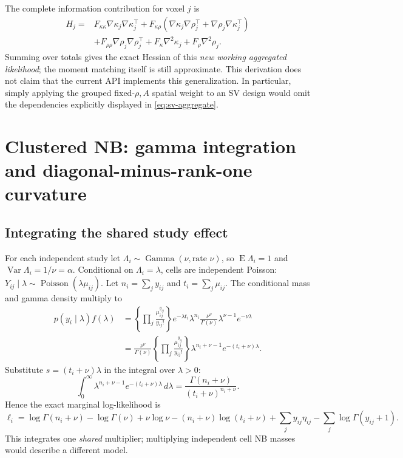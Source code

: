 \documentclass[11pt,a4paper]{article}
\newcommand{\E}{\operatorname{E}}
\newcommand{\Var}{\operatorname{Var}}
\numberwithin{equation}{section}
\begin{document}
The complete information contribution for voxel $j$ is
\begin{align}
 H_j={}&F_{\kappa\kappa}\nabla\kappa_j\nabla\kappa_j^\top
 +F_{\kappa\rho}
       (\nabla\kappa_j\nabla\rho_j^\top+\nabla\rho_j\nabla\kappa_j^\top)\\
 &+F_{\rho\rho}\nabla\rho_j\nabla\rho_j^\top
       +F_\kappa\nabla^2\kappa_j+F_\rho\nabla^2\rho_j.
 \label{eq:sv-aggregate}
\end{align}
Summing over totals gives the exact Hessian of this
\emph{new working aggregated likelihood}; the moment matching itself
is still approximate. This derivation does not claim that the current
API implements this generalization. In particular, simply applying
the grouped fixed-$\rho,A$ spatial weight to an SV design would omit
the dependencies explicitly displayed in \eqref{eq:sv-aggregate}.

\section{Clustered NB: gamma integration and diagonal-minus-rank-one curvature}
\label{sec:clustered}

\subsection{Integrating the shared study effect}
For each independent study let
$\Lambda_i\sim\operatorname{Gamma}(\nu,\text{rate }\nu)$, so
$\E\Lambda_i=1$ and $\Var\Lambda_i=1/\nu=\alpha$.
Conditional on $\Lambda_i=\lambda$, cells are independent Poisson:
$Y_{ij}\mid\lambda\sim\operatorname{Poisson}(\lambda\mu_{ij})$.
Let $n_i=\sum_jy_{ij}$ and $t_i=\sum_j\mu_{ij}$.
The conditional mass and gamma density multiply to
\begin{align}
 p(y_i\mid\lambda)f(\lambda)
 &=\left\{\prod_j\frac{\mu_{ij}^{y_{ij}}}{y_{ij}!}\right\}
       e^{-\lambda t_i}\lambda^{n_i}
       \frac{\nu^\nu}{\Gamma(\nu)}
          \lambda^{\nu-1}e^{-\nu\lambda}\\
 &=\frac{\nu^\nu}{\Gamma(\nu)}
   \left\{\prod_j\frac{\mu_{ij}^{y_{ij}}}{y_{ij}!}\right\}
     \lambda^{n_i+\nu-1}e^{-(t_i+\nu)\lambda}.
\end{align}
Substitute $s=(t_i+\nu)\lambda$ in the integral over $\lambda>0$:
\[
 \int_0^\infty \lambda^{n_i+\nu-1}e^{-(t_i+\nu)\lambda}\,d\lambda
 =\frac{\Gamma(n_i+\nu)}{(t_i+\nu)^{n_i+\nu}}.
\]
Hence the exact marginal log-likelihood is
\begin{equation}\label{eq:cluster-ll}
 \ell_i=\log\Gamma(n_i+\nu)-\log\Gamma(\nu)+\nu\log\nu
       -(n_i+\nu)\log(t_i+\nu)+\sum_j y_{ij}\eta_{ij}
       -\sum_j\log\Gamma(y_{ij}+1).
\end{equation}
This integrates one \emph{shared} multiplier; multiplying independent
cell NB masses would describe a different model.
\end{document}
